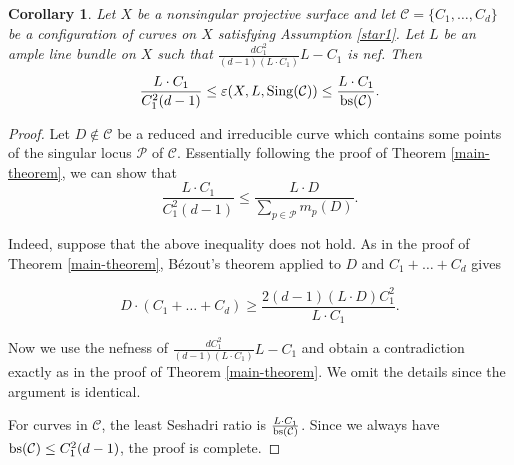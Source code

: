 \documentclass[12pt,reqno]{amsart}
\theoremstyle{plain}
\numberwithin{equation}{section}
\newtheorem{corollary}[theorem]{Corollary}
\theoremstyle{definition}
\begin{document}
\begin{corollary}\label{cor-main}
Let $X$ be a nonsingular projective surface and let $\mathcal{C} = \{C_{1}, \ldots, C_{d}\}$ be a configuration of curves on $X$ satisfying Assumption \ref{star1}.
 Let $L$ be an ample line bundle on $X$
		such that  $\frac{dC_1^2}{(d-1)(L\cdot C_1)}L-C_1$ is nef.   Then
$$\frac{L\cdot C_1}{C_1^2(d-1)} \le \varepsilon(X, L,{\rm Sing}(\mathcal{C})) \le \frac{L \cdot C_1}{{\rm bs} (\mathcal{C})}  .$$
\end{corollary} 
\begin{proof}

Let  $D \notin \mathcal{C}$ be 
a reduced and irreducible curve which contains some points of the singular locus $\mathcal{P}$ of $\mathcal{C}$. Essentially following the proof of Theorem \ref{main-theorem}, we can show that 
$$ \frac{L\cdot C_1}{C_1^2(d-1)} \le \frac{L \cdot D}{\sum_{p \in \mathcal{P}} m_{p}(D)}.$$


Indeed, suppose that the above inequality does not hold. 
As in the proof of Theorem \ref{main-theorem}, B\'ezout's theorem applied to $D$ and $C_1+\dots+C_d$ gives
		

$$		 D\cdot (C_{1}+ \ldots + C_{d}) \ge  
\frac{2(d-1)(L \cdot D)C_1^2}{L\cdot C_1}.$$

		Now we use the nefness of 
  $\frac{dC_1^2}{(d-1)(L\cdot C_1)}L-C_1$ and obtain a contradiction exactly as in the proof of Theorem \ref{main-theorem}. We omit the details since the argument is identical. 


For curves in $\mathcal{C}$, the least Seshadri ratio is  $\frac{L \cdot C_1}{\rm{bs} (\mathcal{C})}$. 
Since we always have ${\rm bs} (\mathcal{C}) \le C_1^2(d-1)$, the proof is complete. 
\end{proof}
\end{document}
